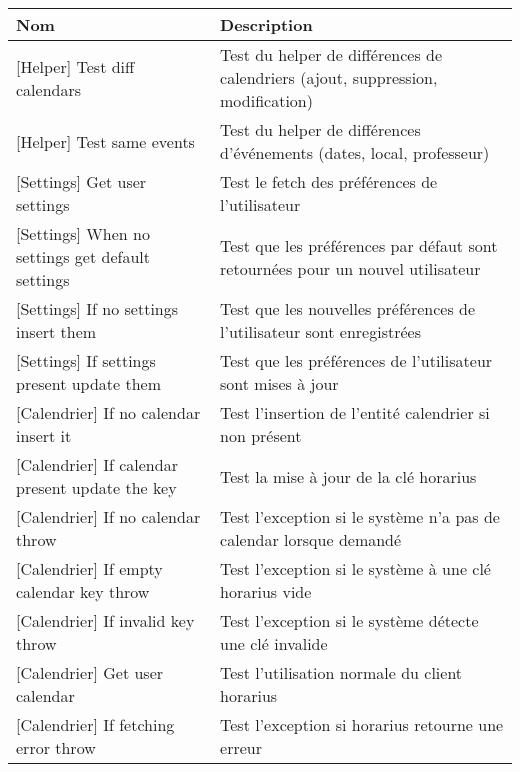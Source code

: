 \begin{tabular}{P{0.3\textwidth}P{0.6\textwidth}}
\hline
\bf Nom
&
\bf Description
\\
\hline
\hline%

[Helper] Test diff calendars
&
Test du helper de différences de calendriers (ajout, suppression, modification)
\\%

[Helper] Test same events
&
Test du helper de différences d'événements (dates, local, professeur)
\\%

[Settings] Get user settings
&
Test le fetch des préférences de l'utilisateur
\\%

[Settings] When no settings get default settings
&
Test que les préférences par défaut sont retournées pour un nouvel utilisateur
\\%

[Settings] If no settings insert them
&
Test que les nouvelles préférences de l'utilisateur sont enregistrées
\\%

[Settings] If settings present update them
&
Test que les préférences de l'utilisateur sont mises à jour
\\%

[Calendrier] If no calendar insert it
&
Test l'insertion de l'entité calendrier si non présent
\\%

[Calendrier] If calendar present update the key
&
Test la mise à jour de la clé horarius
\\%

[Calendrier] If no calendar throw
&
Test l'exception si le système n'a pas de calendar lorsque demandé
\\%

[Calendrier] If empty calendar key throw
&
Test l'exception si le système à une clé horarius vide
\\%

[Calendrier] If invalid key throw
&
Test l'exception si le système détecte une clé invalide
\\%

[Calendrier] Get user calendar
&
Test l'utilisation normale du client horarius
\\%

[Calendrier] If fetching error throw
&
Test l'exception si horarius retourne une erreur
\\%


\end{tabular}
